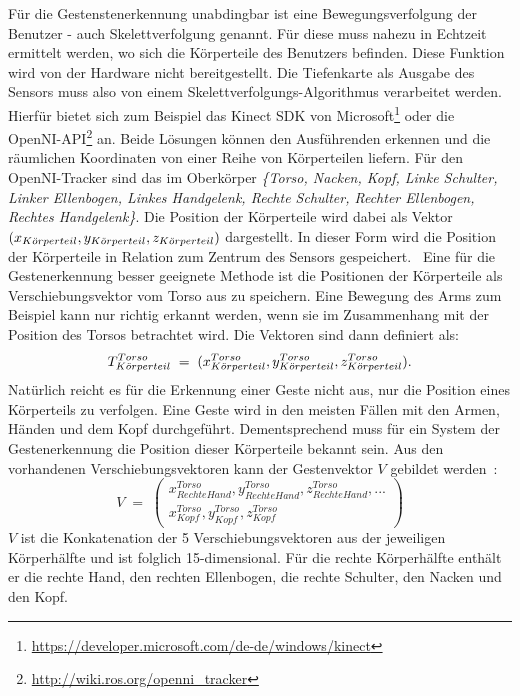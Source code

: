Für die Gestenstenerkennung unabdingbar ist eine Bewegungsverfolgung der Benutzer - auch Skelettverfolgung genannt. Für diese muss nahezu in Echtzeit ermittelt werden, wo sich die Körperteile des Benutzers befinden. Diese Funktion wird von der Hardware nicht bereitgestellt. Die Tiefenkarte als Ausgabe des Sensors muss also von einem Skelettverfolgungs-Algorithmus verarbeitet werden. Hierfür bietet sich zum Beispiel das Kinect SDK von Microsoft\footnote{\url{https://developer.microsoft.com/de-de/windows/kinect}} oder die OpenNI-API\footnote{\url{http://wiki.ros.org/openni_tracker}} an. Beide Lösungen können den Ausführenden erkennen und die räumlichen Koordinaten von einer Reihe von Körperteilen liefern. Für den OpenNI-Tracker sind das im Oberkörper \textit{\{Torso, Nacken, Kopf, Linke Schulter, Linker Ellenbogen, Linkes Handgelenk, Rechte Schulter, Rechter Ellenbogen, Rechtes Handgelenk\}}. Die Position der Körperteile wird dabei als Vektor $(x_{K\Ddot{o}rperteil}, y_{K\Ddot{o}rperteil}, z_{K\Ddot{o}rperteil})$ dargestellt. In dieser Form wird die Position der Körperteile in Relation zum Zentrum des Sensors gespeichert.~\cite{skeletonTracking} Eine für die Gestenerkennung besser geeignete Methode ist die Positionen der Körperteile als Verschiebungsvektor vom Torso aus zu speichern. Eine Bewegung des Arms zum Beispiel kann nur richtig erkannt werden, wenn sie im Zusammenhang mit der Position des Torsos betrachtet wird. Die Vektoren sind dann definiert als: 
\begin{equation}
    T_{K\Ddot{o}rperteil}^{Torso} \; = \; (x_{K\Ddot{o}rperteil}^{Torso}, y_{K\Ddot{o}rperteil}^{Torso}, z_{K\Ddot{o}rperteil}^{Torso}). 
\end{equation}
Natürlich reicht es für die Erkennung einer Geste nicht aus, nur die Position eines Körperteils zu verfolgen. Eine Geste wird in den meisten Fällen mit den Armen, Händen und dem Kopf durchgeführt. Dementsprechend muss für ein System der Gestenerkennung die Position dieser Körperteile bekannt sein. Aus den vorhandenen Verschiebungsvektoren kann der Gestenvektor $V$ gebildet werden~\cite{flexibleSystem}:
\begin{equation} \label{Gestenvektor}
    V \; = \; \begin{pmatrix}x_{Rechte Hand}^{Torso}, y_{Rechte Hand}^{Torso}, z_{Rechte Hand}^{Torso}, ...\\x_{Kopf}^{Torso}, y_{Kopf}^{Torso}, z_{Kopf}^{Torso}\end{pmatrix} 
\end{equation}
$V$ ist die Konkatenation der 5 Verschiebungsvektoren aus der jeweiligen Körperhälfte und ist folglich 15-dimensional. Für die rechte Körperhälfte enthält er die rechte Hand, den rechten Ellenbogen, die rechte Schulter, den Nacken und den Kopf.~\cite{flexibleSystem}

